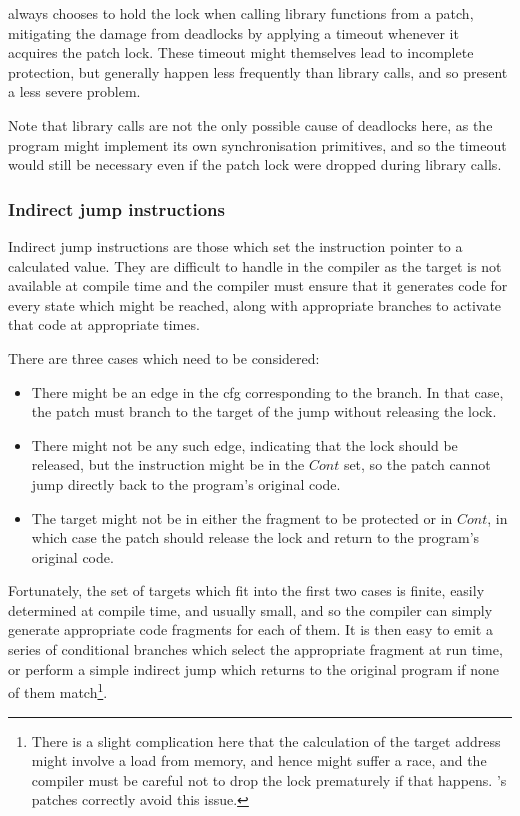 {\Implementation} always chooses to hold the lock when calling library
functions from a patch, mitigating the damage from deadlocks by
applying a timeout whenever it acquires the patch lock.  These timeout
might themselves lead to incomplete protection, but generally happen
less frequently than library calls, and so present a less severe
problem.

Note that library calls are not the only possible cause of deadlocks
here, as the program might implement its own synchronisation
primitives\cite{Jannesari2010}, and so the timeout would still be
necessary even if the patch lock were dropped during library calls.

\subsubsection{Indirect jump instructions}


Indirect jump instructions are those which set the instruction pointer
to a calculated value.  They are difficult to handle in the compiler
as the target is not available at compile time and the compiler must
ensure that it generates code for every state which might be reached,
along with appropriate branches to activate that code at appropriate
times.

There are three cases which need to be considered:

\begin{itemize}
\item There might be an edge in the \gls{cfg} corresponding to the branch.
  In that case, the patch must branch to the target of the jump
  without releasing the lock.
\item There might not be any such edge, indicating that the lock
  should be released, but the instruction might be in the
  $\mathit{Cont}$ set, so the patch cannot jump directly back to the
  program's original code.
\item The target might not be in either the fragment to be protected
  or in $\mathit{Cont}$, in which case the patch should release the
  lock and return to the program's original code.
\end{itemize}

Fortunately, the set of targets which fit into the first two cases is
finite, easily determined at compile time, and usually small, and so
the compiler can simply generate appropriate code fragments for each
of them.  It is then easy to emit a series of conditional branches
which select the appropriate fragment at run time, or perform a simple
indirect jump which returns to the original program if none of them
match\footnote{There is a slight complication here that the
  calculation of the target address might involve a load from memory,
  and hence might suffer a race, and the compiler must be careful not
  to drop the lock prematurely if that happens.  {\Implementation}'s
  patches correctly avoid this issue.}.

